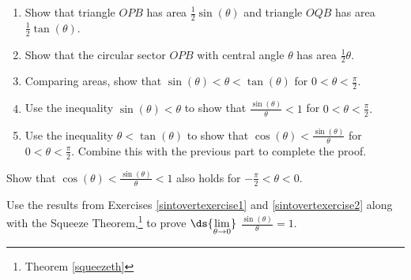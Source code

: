 \documentclass{ximera}
\begin{document}
\begin{problem}
\begin{enumerate}

\item Show that triangle $OPB$ has area $\frac{1}{2} \sin(\theta)$ and triangle $OQB$ has area $\frac{1}{2} \tan(\theta)$.
\item Show that the circular sector $OPB$ with central angle $\theta$ has area $\frac{1}{2} \theta$.
\item Comparing areas, show that $\sin(\theta) < \theta < \tan(\theta)$ for $0 < \theta < \frac{\pi}{2}.$ 
\item Use the inequality $\sin(\theta) < \theta$ to show that $\frac{\sin(\theta)}{\theta} < 1$ for $0 < \theta < \frac{\pi}{2}.$
\item Use the inequality $\theta < \tan(\theta)$ to show that $\cos(\theta) < \frac{\sin(\theta)}{\theta}$ for $0 < \theta < \frac{\pi}{2}.$  Combine this with the previous part to complete the proof.

\end{enumerate}
\end{problem}

\begin{problem} \label{sintovertexercise2} 
Show that $\cos(\theta) < \frac{\sin(\theta)}{\theta} < 1$ also holds for $-\frac{\pi}{2}< \theta < 0$.
\end{problem}

\begin{problem}\label{sintovertexercise3}  
Use the results from Exercises \ref{sintovertexercise1}  and \ref{sintovertexercise2} along with the Squeeze Theorem,\footnote{Theorem \ref{squeezeth}}  to prove  $\ds{ \lim_{\theta \rightarrow 0}}$ $ \frac{\sin(\theta)}{\theta} = 1$.

\end{problem}
\end{document}
